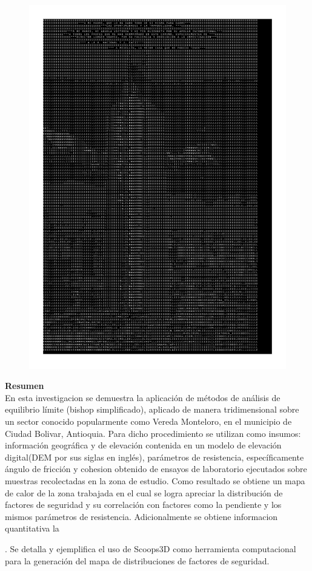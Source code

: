 \newpage
\thispagestyle{empty} \textbf{}\normalsize
\\\\\\%
\\\\
\begin{figure}[H]
\centering
\includegraphics[trim={0 0.1cm 2.2cm 0},clip,scale=0.8]{img/dedicatoria/dedicatoria.pdf}
\end{figure}

\newpage{\pagestyle{empty}\cleardoublepage}

\newpage
\textbf{\LARGE Resumen}\\
En esta investigacion se demuestra la aplicaci\'on de m\'etodos de an\'alisis de equilibrio l\'imite (bishop simplificado), aplicado de manera tridimensional sobre un sector conocido popularmente como Vereda Monteloro, en el municipio de Ciudad Bolivar, Antioquia. Para dicho procedimiento se utilizan como insumos: informaci\'on geogr\'afica y de elevaci\'on contenida en un modelo de elevaci\'on digital(DEM por sus siglas en ingl\'es), par\'ametros de resistencia, espec\'ificamente \'angulo de fricci\'on y cohesion obtenido de ensayos de laboratorio ejecutados sobre muestras recolectadas en la zona de estudio. Como resultado se obtiene un mapa de calor de la zona trabajada en el cual se logra apreciar la distribuci\'on de factores de seguridad y su correlaci\'on con factores como la pendiente y los mismos par\'ametros de resistencia. Adicionalmente se obtiene informacion quantitativa la 

. Se detalla y ejemplifica el uso de Scoops3D como herramienta computacional para la generaci\'on del mapa de distribuciones de factores de seguridad. 
\\\\
